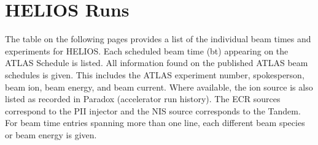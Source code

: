 
\chapter{HELIOS Runs}
\label{runs}
The table on the following pages provides a list of the individual beam times and experiments for HELIOS.  Each scheduled beam time (bt) appearing on the ATLAS Schedule is listed.  All information found on the published ATLAS beam schedules is given.  This includes the ATLAS experiment number, spokesperson, beam ion, beam energy, and beam current.  Where available, the ion source %
is also listed as recorded in Paradox (accelerator run history).  The ECR sources correspond to the PII injector and the NIS source corresponds to the Tandem.  For beam time entries spanning more than one line, each different beam species or beam energy is given.

